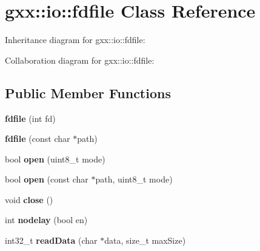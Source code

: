 \hypertarget{classgxx_1_1io_1_1fdfile}{}\section{gxx\+:\+:io\+:\+:fdfile Class Reference}
\label{classgxx_1_1io_1_1fdfile}


Inheritance diagram for gxx\+:\+:io\+:\+:fdfile\+:


Collaboration diagram for gxx\+:\+:io\+:\+:fdfile\+:
\subsection*{Public Member Functions}
\begin{DoxyCompactItemize}
\item 
{\bfseries fdfile} (int fd)\hypertarget{classgxx_1_1io_1_1fdfile_acd19f40ea5bddf489b5ba31e7e7e92b6}{}\label{classgxx_1_1io_1_1fdfile_acd19f40ea5bddf489b5ba31e7e7e92b6}

\item 
{\bfseries fdfile} (const char $\ast$path)\hypertarget{classgxx_1_1io_1_1fdfile_a91ed2c96d8b0f11743c757382c03856d}{}\label{classgxx_1_1io_1_1fdfile_a91ed2c96d8b0f11743c757382c03856d}

\item 
bool {\bfseries open} (uint8\+\_\+t mode)\hypertarget{classgxx_1_1io_1_1fdfile_a4136ebc1a0cb06959d77a3a208370499}{}\label{classgxx_1_1io_1_1fdfile_a4136ebc1a0cb06959d77a3a208370499}

\item 
bool {\bfseries open} (const char $\ast$path, uint8\+\_\+t mode)\hypertarget{classgxx_1_1io_1_1fdfile_a4385f6258e930936490b1783409e7064}{}\label{classgxx_1_1io_1_1fdfile_a4385f6258e930936490b1783409e7064}

\item 
void {\bfseries close} ()\hypertarget{classgxx_1_1io_1_1fdfile_a17938c189c1daf14bb540043ee0bb949}{}\label{classgxx_1_1io_1_1fdfile_a17938c189c1daf14bb540043ee0bb949}

\item 
int {\bfseries nodelay} (bool en)\hypertarget{classgxx_1_1io_1_1fdfile_af1f04e5ea0f802ed249e7e70f22e640a}{}\label{classgxx_1_1io_1_1fdfile_af1f04e5ea0f802ed249e7e70f22e640a}

\item 
int32\+\_\+t {\bfseries read\+Data} (char $\ast$data, size\+\_\+t max\+Size)\hypertarget{classgxx_1_1io_1_1fdfile_aab55e428338784966263ce9311c752ea}{}\label{classgxx_1_1io_1_1fdfile_aab55e428338784966263ce9311c752ea}


\end{DoxyCompactItemize}
